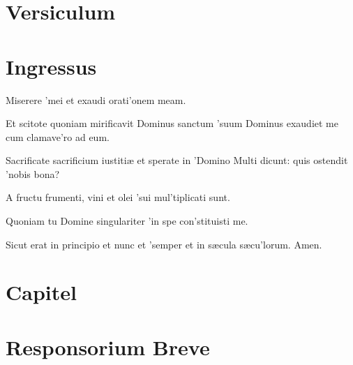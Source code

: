 \documentclass[initial=ZallmanCaps,staff=19,font=greciliae,11pt,a4paper,openany,twoside,choralsign=PfefferMediaeval]{gregorian}
\begin{document}
\section*{Versiculum}
\section*{Ingressus}
\newpage
{}
\par
\begin{multicols}{2}\setlength{\columnseprule}{0.2px}
Miserere 'mei \grestar{} et exaudi orati'onem meam.\par
{}\par
Et scitote quoniam mirificavit Dominus sanctum 'suum \grestar{} Dominus exaudiet me cum clamave'ro ad eum.\par
{}\par
Sacrificate sacrificium iustitiæ \gredagger{} et sperate in 'Domino \grestar{} Multi dicunt: quis ostendit 'nobis bona?\par
{}\par
A fructu frumenti, vini et olei 'sui \grestar{} mul'tiplicati sunt.\par
{}\par
Quoniam tu Domine singulariter 'in spe \grestar{} con'stituisti me.\par
{}\par
Sicut erat in principio et nunc et 'semper \grestar{} et in sæcula sæcu'lorum. Amen.
\end{multicols}\par
\section*{Capitel}
\newpage
\section*{Responsorium Breve}
\par
\end{document}
